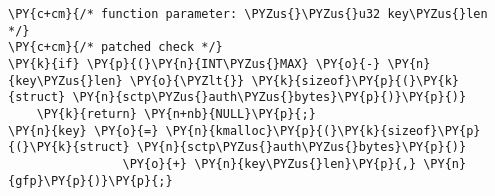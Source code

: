 \begin{Verbatim}[commandchars=\\\{\},codes={\catcode`\$=3\catcode`\^=7\catcode`\_=8}]
\PY{c+cm}{/* function parameter: \PYZus{}\PYZus{}u32 key\PYZus{}len */}
\PY{c+cm}{/* patched check */}
\PY{k}{if} \PY{p}{(}\PY{n}{INT\PYZus{}MAX} \PY{o}{-} \PY{n}{key\PYZus{}len} \PY{o}{\PYZlt{}} \PY{k}{sizeof}\PY{p}{(}\PY{k}{struct} \PY{n}{sctp\PYZus{}auth\PYZus{}bytes}\PY{p}{)}\PY{p}{)}
    \PY{k}{return} \PY{n+nb}{NULL}\PY{p}{;}
\PY{n}{key} \PY{o}{=} \PY{n}{kmalloc}\PY{p}{(}\PY{k}{sizeof}\PY{p}{(}\PY{k}{struct} \PY{n}{sctp\PYZus{}auth\PYZus{}bytes}\PY{p}{)}
                \PY{o}{+} \PY{n}{key\PYZus{}len}\PY{p}{,} \PY{n}{gfp}\PY{p}{)}\PY{p}{;}
\end{Verbatim}

